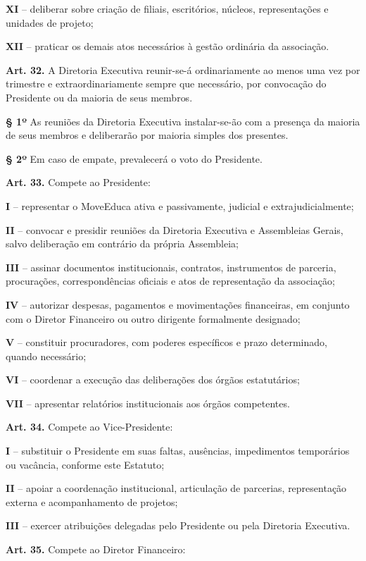 \documentclass[11pt,a4paper]{article}
\begin{document}
\textbf{XI} -- deliberar sobre criação de filiais, escritórios, núcleos, representações e unidades de projeto;

\textbf{XII} -- praticar os demais atos necessários à gestão ordinária da associação.

\textbf{Art. 32.} A Diretoria Executiva reunir-se-á ordinariamente ao menos uma vez por trimestre e extraordinariamente sempre que necessário, por convocação do Presidente ou da maioria de seus membros.

\textbf{§ 1º} As reuniões da Diretoria Executiva instalar-se-ão com a presença da maioria de seus membros e deliberarão por maioria simples dos presentes.

\textbf{§ 2º} Em caso de empate, prevalecerá o voto do Presidente.

\textbf{Art. 33.} Compete ao Presidente:

\textbf{I} -- representar o MoveEduca ativa e passivamente, judicial e extrajudicialmente;

\textbf{II} -- convocar e presidir reuniões da Diretoria Executiva e Assembleias Gerais, salvo deliberação em contrário da própria Assembleia;

\textbf{III} -- assinar documentos institucionais, contratos, instrumentos de parceria, procurações, correspondências oficiais e atos de representação da associação;

\textbf{IV} -- autorizar despesas, pagamentos e movimentações financeiras, em conjunto com o Diretor Financeiro ou outro dirigente formalmente designado;

\textbf{V} -- constituir procuradores, com poderes específicos e prazo determinado, quando necessário;

\textbf{VI} -- coordenar a execução das deliberações dos órgãos estatutários;

\textbf{VII} -- apresentar relatórios institucionais aos órgãos competentes.

\textbf{Art. 34.} Compete ao Vice-Presidente:

\textbf{I} -- substituir o Presidente em suas faltas, ausências, impedimentos temporários ou vacância, conforme este Estatuto;

\textbf{II} -- apoiar a coordenação institucional, articulação de parcerias, representação externa e acompanhamento de projetos;

\textbf{III} -- exercer atribuições delegadas pelo Presidente ou pela Diretoria Executiva.

\textbf{Art. 35.} Compete ao Diretor Financeiro:
\end{document}
